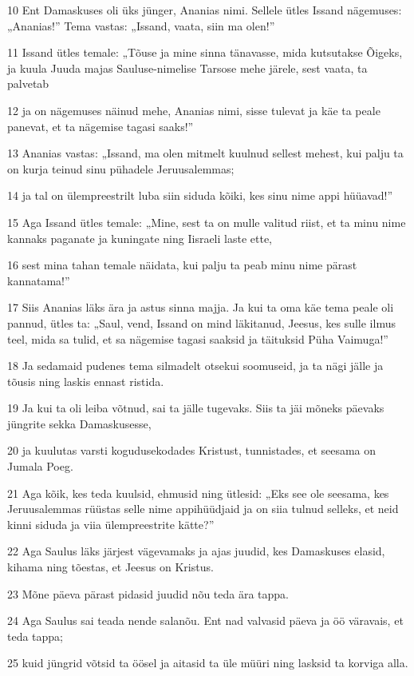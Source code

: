\par 10 Ent Damaskuses oli üks jünger, Ananias nimi. Sellele ütles Issand nägemuses: „Ananias!” Tema vastas: „Issand, vaata, siin ma olen!”
\par 11 Issand ütles temale: „Tõuse ja mine sinna tänavasse, mida kutsutakse Õigeks, ja kuula Juuda majas Sauluse-nimelise Tarsose mehe järele, sest vaata, ta palvetab
\par 12 ja on nägemuses näinud mehe, Ananias nimi, sisse tulevat ja käe ta peale panevat, et ta nägemise tagasi saaks!”
\par 13 Ananias vastas: „Issand, ma olen mitmelt kuulnud sellest mehest, kui palju ta on kurja teinud sinu pühadele Jeruusalemmas;
\par 14 ja tal on ülempreestrilt luba siin siduda kõiki, kes sinu nime appi hüüavad!”
\par 15 Aga Issand ütles temale: „Mine, sest ta on mulle valitud riist, et ta minu nime kannaks paganate ja kuningate ning Iisraeli laste ette,
\par 16 sest mina tahan temale näidata, kui palju ta peab minu nime pärast kannatama!”
\par 17 Siis Ananias läks ära ja astus sinna majja. Ja kui ta oma käe tema peale oli pannud, ütles ta: „Saul, vend, Issand on mind läkitanud, Jeesus, kes sulle ilmus teel, mida sa tulid, et sa nägemise tagasi saaksid ja täituksid Püha Vaimuga!”
\par 18 Ja sedamaid pudenes tema silmadelt otsekui soomuseid, ja ta nägi jälle ja tõusis ning laskis ennast ristida.
\par 19 Ja kui ta oli leiba võtnud, sai ta jälle tugevaks. Siis ta jäi mõneks päevaks jüngrite sekka Damaskusesse,
\par 20 ja kuulutas varsti kogudusekodades Kristust, tunnistades, et seesama on Jumala Poeg.
\par 21 Aga kõik, kes teda kuulsid, ehmusid ning ütlesid: „Eks see ole seesama, kes Jeruusalemmas rüüstas selle nime appihüüdjaid ja on siia tulnud selleks, et neid kinni siduda ja viia ülempreestrite kätte?”
\par 22 Aga Saulus läks järjest vägevamaks ja ajas juudid, kes Damaskuses elasid, kihama ning tõestas, et Jeesus on Kristus.
\par 23 Mõne päeva pärast pidasid juudid nõu teda ära tappa.
\par 24 Aga Saulus sai teada nende salanõu. Ent nad valvasid päeva ja öö väravais, et teda tappa;
\par 25 kuid jüngrid võtsid ta öösel ja aitasid ta üle müüri ning lasksid ta korviga alla.

